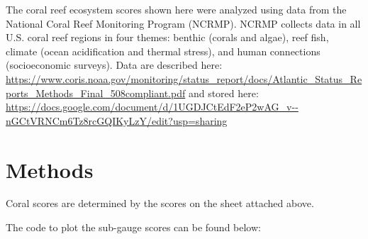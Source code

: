 \documentclass[
]{book}
\begin{document}
The coral reef ecosystem scores shown here were analyzed using data from the National Coral Reef Monitoring Program (NCRMP). NCRMP collects data in all U.S. coral reef regions in four themes: benthic (corals and algae), reef fish, climate (ocean acidification and thermal stress), and human connections (socioeconomic surveys). Data are described here: \url{https://www.coris.noaa.gov/monitoring/status_report/docs/Atlantic_Status_Reports_Methods_Final_508compliant.pdf} and stored here: \url{https://docs.google.com/document/d/1UGDJCtEdF2eP2wAG_v--nGCtVRNCm6Tz8rcGQIKyLzY/edit?usp=sharing}

\hypertarget{methods-1}{%
\section{Methods}\label{methods-1}}

Coral scores are determined by the scores on the sheet attached above.

The code to plot the sub-gauge scores can be found below:
\end{document}
